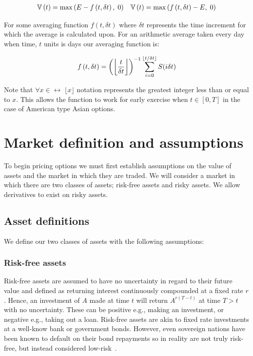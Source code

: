\begin{align*}
    \mathbb{V}\left(t\right) = \max\left(E-f\left(t,\delta t\right),\;0\right) && \mathbb{V}\left(t\right) = \max\left(f\left(t,\delta t\right)-E,\;0\right)
\end{align*}


For some averaging function \(f(t,\delta t)\) where \(\delta t\) represents the time increment for which the average is calculated upon. For an arithmetic average taken every day when time, \(t\) units is days our averaging function is:

\begin{equation*}
    f\left(t,\delta t\right) = \left(\left\lfloor\frac{t}{\delta t}\right\rfloor\right)^{-1} \sum_{i=0}^{\lfloor t/\delta t\rfloor}S(i\delta t)
\end{equation*}

Note that \(\forall x\in\rel \; \lfloor x \rfloor \) notation represents the greatest integer less than or equal to \(x \). This allows the function to work for early exercise when \(t\in[0,T] \) in the case of American type Asian options.

\section{Market definition and assumptions}

To begin pricing options we must first establish assumptions on the value of assets and the market in which they are traded. We will consider a market in which there are two classes of assets; risk-free assets and risky assets. We allow derivatives to exist on risky assets.

\subsection{Asset definitions}

We define our two classes of assets with the following assumptions:

\subsubsection{Risk-free assets}

Risk-free assets are assumed to have no uncertainty in regard to their future value and defined as returning interest continuously compounded at a fixed rate \(r\). Hence, an investment of \(A\) made at time \(t\) will return \(A^{r\left(T-t\right)}\) at time \(T>t\) with no uncertainty. These can be positive e.g., making an investment, or negative e.g., taking out a loan. Risk-free assets are akin to fixed rate investments at a well-know bank or government bonds. However, even sovereign nations have been known to default on their bond repayments so in reality are not truly risk-free, but instead considered low-risk~\cite{kitanov2015risk}.

